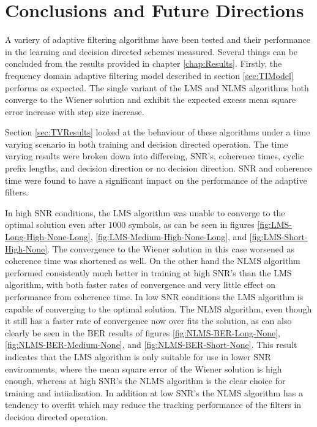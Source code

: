 \chapter{Conclusions and Future Directions}
\label{chap:Conclusion}

A variery of adaptive filtering algorithms have been tested %
and their performance in the learning and decision directed %
schemes measured. Several things can be concluded from %
the results provided in chapter \ref{chap:Results}. Firstly, %
the frequency domain adaptive filtering model described in %
section \ref{sec:TIModel} performs as expected. The single %
variant of the LMS and NLMS algorithms both converge to %
the Wiener solution and exhibit the expected excess %
mean square error increase with step size increase.

Section \ref{sec:TVResults} looked at the behaviour %
of these algorithms under a time varying scenario in %
both training and decision directed operation. The %
time varying results were broken down into %
differeing, SNR's, coherence times, cyclic prefix lengths, %
and decision direction or no decision direction. SNR and %
coherence time were found to have a significant impact %
on the performance of the adaptive filters.

In high SNR conditions, the LMS algorithm was unable %
to converge to the optimal solution even after $1000$ %
symbols, as can be seen in figures \ref{fig:LMS-Long-High-None-Long}, %
\ref{fig:LMS-Medium-High-None-Long}, and %
\ref{fig:LMS-Short-High-None}. The convergence to the %
Wiener solution in this case worsened as coherence %
time was shortened as well. On the other hand the NLMS algorithm %
performed consistently much better in training at high SNR's %
than the LMS algorithm, with both faster rates of convergence and %
very little effect on performance from coherence time. In low %
SNR conditions the LMS algorithm is capable of converging %
to the optimal solution. The NLMS algorithm, even though it %
still has a faster rate of convergence now over fits the solution, %
as can also clearly be seen in the BER results of figures %
\ref{fig:NLMS-BER-Long-None}, \ref{fig:NLMS-BER-Medium-None}, 
and \ref{fig:NLMS-BER-Short-None}. This result %
indicates that the LMS algorithm is only suitable for use in %
lower SNR environments, where the mean square error %
of the Wiener solution is high enough, whereas at high %
SNR's the NLMS algorithm is the clear choice for training and %
intiialisation. In addition at low SNR's the NLMS algorithm %
has a tendency to overfit which may reduce the tracking %
performance of the filters in decision directed operation.

